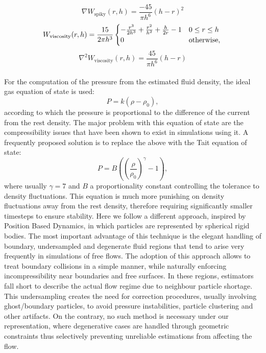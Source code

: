 \documentclass{llncs}
\begin{document}
\begin{equation*}
  \label{eq:spiky-gradient}
  \nabla W_{\text{spiky}}(r, h) = \frac{-45}{\pi h^6} (h-r)^2
\end{equation*}
\begin{equation}
  \label{eq:viscosity}
  W_{\text{viscosity}}(r, h) = \frac{15}{2 \pi h^3}
  \begin{cases}
    - \frac{r^3}{2h^3} + \frac{r^2}{h^2} + \frac{h}{2r} - 1 & 0 \leq r \leq h\\
    0 & \text{otherwise},
  \end{cases}\\
\end{equation}
\begin{equation*}
  \label{eq:viscosity-laplacian}
  \nabla^2 W_{\text{viscosity}}(r, h) = \frac{45}{\pi h^6} (h-r)
\end{equation*}

\paragraph{} For the computation of the pressure from the estimated fluid density, the
ideal gas equation of state is used:
\begin{equation}
  \label{eq:ideal-state}
  P = k(\rho - \rho_0),
\end{equation}
according to which the pressure is proportional to the difference of the current from the
rest density. The major problem with this equation of state are the compressibility issues
that have been shown to exist in simulations using it. A frequently proposed solution is
to replace the above with the Tait equation of state:
\begin{equation}
  \label{eq:tait-state}
  P = B \left( \left( \frac{\rho}{\rho_0} \right)^\gamma - 1 \right),
\end{equation}
where usually $\gamma=7$ and $B$ a proportionality constant controlling the tolerance to
density fluctuations. This equation is much more punishing on density fluctuations away
from the rest density, therefore requiring significantly smaller timesteps to ensure
stability. Here we follow a different approach, inspired by Position Based Dynamics, in
which particles are represented by spherical rigid bodies. The most important advantage of
this technique is the elegant handling of boundary, undersampled and degenerate fluid
regions that tend to arise very frequently in simulations of free flows. The adoption of
this approach allows to treat boundary collisions in a simple manner, while naturally
enforcing incompressibility near boundaries and free surfaces. In these regions,
estimators fall short to describe the actual flow regime due to neighbour particle
shortage. This undersampling creates the need for correction procedures, usually involving
ghost/boundary particles, to avoid pressure instabilities, particle clustering and other
artifacts. On the contrary, no such method is necessary under our representation, where
degenerative cases are handled through geometric constraints thus selectively preventing
unreliable estimations from affecting the flow.
\end{document}
